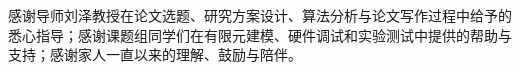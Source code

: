  \setlength{\baselineskip}{20pt}
\begin{thanks}
\noindent 感谢导师刘泽教授在论文选题、研究方案设计、算法分析与论文写作过程中给予的悉心指导；感谢课题组同学们在有限元建模、硬件调试和实验测试中提供的帮助与支持；感谢家人一直以来的理解、鼓励与陪伴。
\end{thanks}
